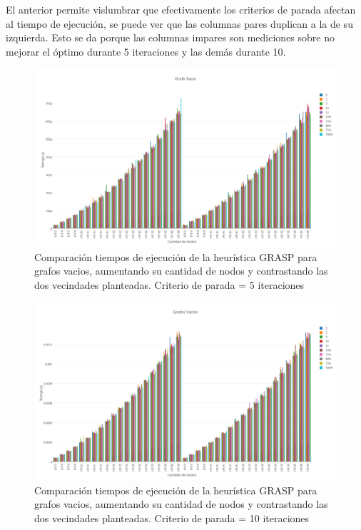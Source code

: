 El anterior permite vislumbrar que efectivamente los criterios de parada afectan al tiempo de ejecuci\'on, se puede ver que las columnas pares duplican a la de su izquierda. Esto se da porque las columnas impares son mediciones sobre no mejorar el \'optimo durante 5 iteraciones y las dem\'as durante 10.

  \begin{figure}[h!]
   \begin{center}
 	\includegraphics[scale=0.35]{imagenes/grasp/vacio-5repes.png}
 	\caption{Comparaci\'on tiempos de ejecuci\'on de la heur\'istica GRASP para grafos vacios, aumentando su cantidad de nodos y contrastando las dos vecindades planteadas. Criterio de parada = 5 iteraciones}
   \end{center}
 \end{figure}

  \begin{figure}[h!]
   \begin{center}
 	\includegraphics[scale=0.35]{imagenes/grasp/vacio-10repes.png}
 	\caption{Comparaci\'on tiempos de ejecuci\'on de la heur\'istica GRASP para grafos vacios, aumentando su cantidad de nodos y contrastando las dos vecindades planteadas. Criterio de parada = 10 iteraciones}
   \end{center}
 \end{figure}

